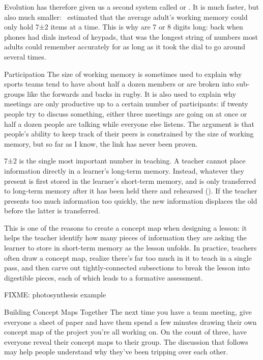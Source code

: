 Evolution has therefore given us a second system
called  or .
It is much faster,
but also much smaller:~\cite{Mill1956} estimated that the average adult's working memory could only hold 7±2 items at a time.
This is why 
are 7 or 8 digits long:
back when phones had dials instead of keypads,
that was the longest string of numbers most adults could remember accurately for as long as it took the dial to go around several times.

\begin{aside}{Participation}
  The size of working memory is sometimes used to explain
  why sports teams tend to have about half a dozen members
  or are broken into sub-groups like the forwards and backs in rugby.
  It is also used to explain why meetings are only productive up to a certain number of participants:
  if twenty people try to discuss something,
  either three meetings are going on at once
  or half a dozen people are talking while everyone else listens.
  The argument is that people's ability to keep track of their peers is constrained by the size of working memory,
  but so far as I know,
  the link has never been proven.
\end{aside}

7±2 is the single most important number in teaching.
A teacher cannot place information directly in a learner's long-term memory.
Instead,
whatever they present is first stored in the learner's short-term memory,
and is only transferred to long-term memory after it has been held there and rehearsed ().
If the teacher presents too much information too quickly,
the new information displaces the old
before the latter is transferred.

This is one of the reasons to create a concept map when designing a lesson:
it helps the teacher identify how many pieces of information
they are asking the learner to store in short-term memory as the lesson unfolds.
In practice,
teachers often draw a concept map,
realize there's far too much in it to teach in a single pass,
and then carve out tightly-connected subsections to break the lesson into digestible pieces,
each of which leads to a formative assessment.

FIXME: photosynthesis example

\begin{aside}{Building Concept Maps Together}
  The next time you have a team meeting,
  give everyone a sheet of paper
  and have them spend a few minutes drawing their own concept map of the project you're all working on.
  On the count of three,
  have everyone reveal their concept maps to their group.
  The discussion that follows may help people understand
  why they've been tripping over each other.
\end{aside}

